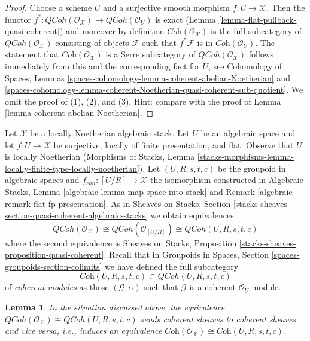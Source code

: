 \documentclass{stacks-project}
\theoremstyle{plain}
\newtheorem{lemma}[subsection]{Lemma}
\theoremstyle{definition}
\theoremstyle{remark}
\numberwithin{equation}{subsection}
\def\QCoh{\mathit{QCoh}}
\begin{document}
\begin{proof}
Choose a scheme $U$ and a surjective smooth morphism $f : U \to \mathcal{X}$.
Then the functor
$f^* : \QCoh(\mathcal{O}_\mathcal{X}) \to \QCoh(\mathcal{O}_U)$
is exact (Lemma \ref{lemma-flat-pullback-quasi-coherent})
and moreover by definition $\textit{Coh}(\mathcal{O}_\mathcal{X})$
is the full subcategory of $\QCoh(\mathcal{O}_\mathcal{X})$ consisting
of objects $\mathcal{F}$ such that $f^*\mathcal{F}$ is in
$\textit{Coh}(\mathcal{O}_U)$. The statement that
$\textit{Coh}(\mathcal{O}_\mathcal{X})$ is a Serre subcategory of
$\QCoh(\mathcal{O}_\mathcal{X})$ follows immediately from this
and the corresponding fact for $U$, see
Cohomology of Spaces, Lemmas
\ref{spaces-cohomology-lemma-coherent-abelian-Noetherian} and
\ref{spaces-cohomology-lemma-coherent-Noetherian-quasi-coherent-sub-quotient}.
We omit the proof of (1), (2), and (3). Hint: compare
with the proof of Lemma \ref{lemma-coherent-abelian-Noetherian}.
\end{proof}

\noindent
Let $\mathcal{X}$ be a locally Noetherian algebraic stack.
Let $U$ be an algebraic space and let $f : U \to \mathcal{X}$
be surjective, locally of finite presentation, and flat.
Observe that $U$ is locally Noetherian
(Morphisms of Stacks, Lemma
\ref{stacks-morphisms-lemma-locally-finite-type-locally-noetherian}).
Let $(U, R, s, t, c)$ be the groupoid in algebraic spaces
and $f_{can} : [U/R] \to \mathcal{X}$ the isomorphism
constructed in
Algebraic Stacks, Lemma \ref{algebraic-lemma-map-space-into-stack} and
Remark \ref{algebraic-remark-flat-fp-presentation}.
As in Sheaves on Stacks, Section
\ref{stacks-sheaves-section-quasi-coherent-algebraic-stacks}
we obtain equivalences
$$
\QCoh(\mathcal{O}_\mathcal{X})
\cong
\QCoh(\mathcal{O}_{[U/R]})
\cong
\QCoh(U, R, s, t, c)
$$
where the second equivalence is
Sheaves on Stacks, Proposition \ref{stacks-sheaves-proposition-quasi-coherent}.
Recall that in Groupoids in Spaces, Section
\ref{spaces-groupoids-section-colimits}
we have defined the full subcategory
$$
\textit{Coh}(U, R, s, t, c) \subset \QCoh(U, R, s, t, c)
$$
of {\it coherent modules} as those $(\mathcal{G}, \alpha)$ such that
$\mathcal{G}$ is a coherent $\mathcal{O}_U$-module.

\begin{lemma}
\label{lemma-coherent-presentation}
In the situation discussed above, the equivalence
$\QCoh(\mathcal{O}_\mathcal{X}) \cong \QCoh(U, R, s, t, c)$
sends coherent sheaves to coherent sheaves and vice versa, i.e.,
induces an equivalence
$\textit{Coh}(\mathcal{O}_\mathcal{X}) \cong \textit{Coh}(U, R, s, t, c)$.
\end{lemma}
\end{document}
